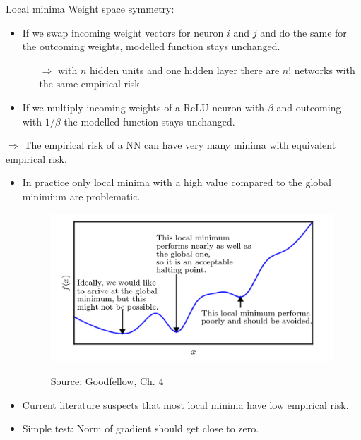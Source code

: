 \begin{vbframe} {Local minima}
   Weight space symmetry:
   \begin{itemize}
       \item If we swap incoming weight vectors for neuron $i$ and $j$
       and do the same for the outcoming weights,
       modelled function stays unchanged.
        \begin{itemize}
           \item[$\Rightarrow$] with $n$ hidden units and one hidden layer
           there are $n!$ networks with the same empirical risk
        \end{itemize}
       \item If we multiply incoming weights of a ReLU neuron with $\beta$
       and outcoming with $1/\beta$ the modelled function stays unchanged.
      \end{itemize}
  $\Rightarrow$ The empirical risk of a NN can have very many
          minima with equivalent empirical risk.

\framebreak 

    \begin{itemize}
     \item In practice only local minima with a high value compared to the global minimium are problematic.
    \begin{figure}
     \begin{center}
     \includegraphics[width=.6\textwidth]{figure/minima.png}
     \end{center}
    \tiny{Source: Goodfellow, Ch. 4}
    \end{figure}
     \item Current literature suspects that most local minima have low empirical risk.
     \item Simple test: Norm of gradient should get close to zero.
\end{itemize}
\end{vbframe}

